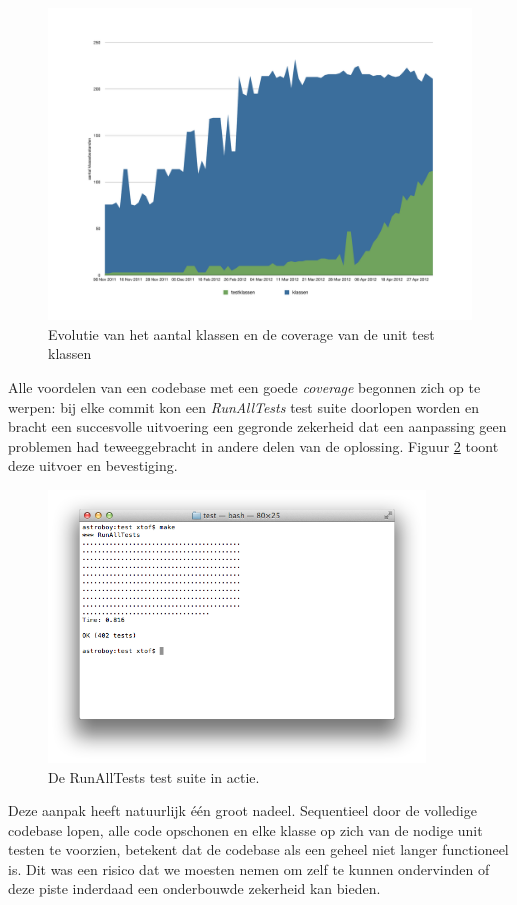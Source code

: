 \documentclass[12pt,a4paper]{report}
\begin{document}
\begin{figure}[htbp]
  \centering
  \includegraphics[width=120mm]{resources/coverage.pdf}
  \caption{Evolutie van het aantal klassen en de coverage van de unit test klassen}
  \label{fig:coverage}
\end{figure}

Alle voordelen van een codebase met een goede \emph{coverage} begonnen zich op te werpen: bij elke commit kon een \emph{RunAllTests} test suite doorlopen worden en bracht een succesvolle uitvoering een gegronde zekerheid dat een aanpassing geen problemen had teweeggebracht in andere delen van de oplossing. Figuur \ref{fig:runalltests} toont deze uitvoer en bevestiging.

\begin{figure}[htbp]
  \centering
  \includegraphics[width=100mm]{resources/runalltests.png}
  \caption{De RunAllTests test suite in actie.}
  \label{fig:runalltests}
\end{figure}

Deze aanpak heeft natuurlijk \'e\'en groot nadeel. Sequentieel door de volledige codebase lopen, alle code opschonen en elke klasse op zich van de nodige unit testen te voorzien, betekent dat de codebase als een geheel niet langer functioneel is. Dit was een risico dat we moesten nemen om zelf te kunnen ondervinden of deze piste inderdaad een onderbouwde zekerheid kan bieden.
\end{document}
